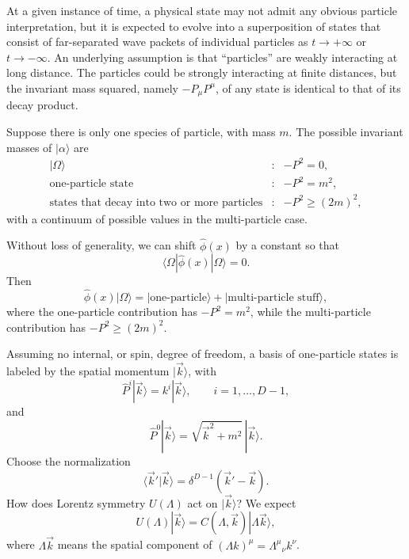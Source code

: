\begin{center}
\end{center}

At a given instance of time, a physical state may not admit any obvious
particle interpretation, but it is expected to evolve into a superposition of
states that consist of far-separated wave packets of individual particles as
\(t\to+\infty\) or \(t\to-\infty\). An underlying assumption is that
``particles'' are weakly interacting at long distance. The particles could be
strongly interacting at finite distances, but the invariant mass squared,
namely \(-P_\mu P^\mu\), of any state is identical to that of its decay
product.

Suppose there is only one species of particle, with mass \(m\). The possible
invariant masses of \(|\alpha\rangle\) are
\[
\begin{array}{rcl}
  |\Omega\rangle
  &:&
  -P^2=0, \\[2mm]
  \text{one-particle state}
  &:&
  -P^2=m^2, \\[2mm]
  \text{states that decay into two or more particles}
  &:&
  -P^2\ge (2m)^2,
\end{array}
\]
with a continuum of possible values in the multi-particle case.

Without loss of generality, we can shift \(\hat\phi(x)\) by a constant so that
\[
  \langle\Omega|\hat\phi(x)|\Omega\rangle=0.
\]
Then
\[
  \hat\phi(x)|\Omega\rangle
  =
  |\text{one-particle}\rangle
  +
  |\text{multi-particle stuff}\rangle,
\]
where the one-particle contribution has \(-P^2=m^2\), while the
multi-particle contribution has \(-P^2\ge(2m)^2\).

Assuming no internal, or spin, degree of freedom, a basis of one-particle
states is labeled by the spatial momentum \(|\vec k\rangle\), with
\[
  \hat P^i|\vec k\rangle=k^i|\vec k\rangle,
  \qquad
  i=1,\ldots,D-1,
\]
and
\[
  \hat P^0|\vec k\rangle
  =
  \sqrt{\vec k^2+m^2}\,|\vec k\rangle.
\]
Choose the normalization
\[
  \langle\vec k'|\vec k\rangle
  =
  \delta^{D-1}(\vec k'-\vec k).
\]
How does Lorentz symmetry \(U(\Lambda)\) act on \(|\vec k\rangle\)?
We expect
\[
  U(\Lambda)|\vec k\rangle
  =
  C(\Lambda,\vec k)|\Lambda\vec k\rangle,
\]
where \(\Lambda\vec k\) means the spatial component of
\((\Lambda k)^\mu=\Lambda^\mu{}_\nu k^\nu\).

